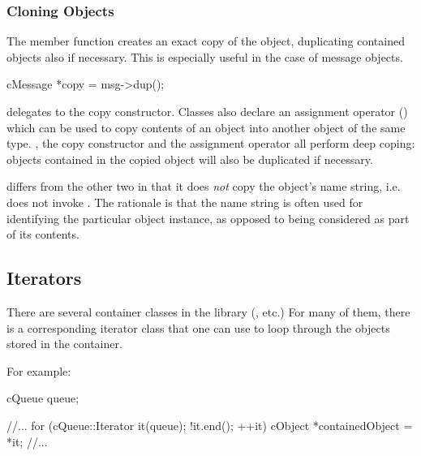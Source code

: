 
\subsubsection{Cloning Objects}
\label{sec:sim-lib:dup}

The  member function creates an exact copy of the
object, duplicating
contained objects also if necessary. This is especially useful in the
case of message objects.

\begin{cpp}
cMessage *copy = msg->dup();
\end{cpp}

 delegates to the copy constructor. Classes also declare
an assignment operator () which can be used to copy contents
of an object into another object of the same type. , the copy
constructor and the assignment operator all perform deep coping: objects
contained in the copied object will also be duplicated if necessary.

 differs from the other two in that it does \textit{not}
copy the object's name string, i.e. does not invoke .
The rationale is that the name string is often used for identifying the particular
object instance, as opposed to being considered as part of its contents.


\subsection{Iterators}
\label{sec:sim-lib:iterators}

There are several container classes in the library (,
 etc.) For many of them, there is a corresponding
iterator class that one can use to loop through the objects stored in
the container.

For example:

\begin{cpp}
cQueue queue;

//...
for (cQueue::Iterator it(queue); !it.end(); ++it) {
    cObject *containedObject = *it;
    //...
}
\end{cpp}

